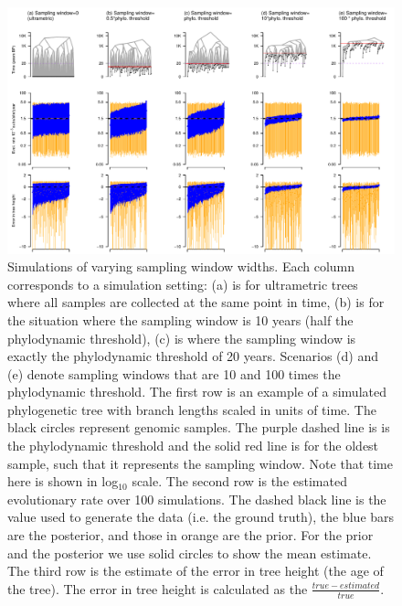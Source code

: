 \documentclass[11pt]{article}
\begin{document}
\begin{landscape}
	\begin{figure}[H]
		\begin{center}
			\includegraphics[scale=0.7, angle=0]{summary_all_estimates_correct_prior.pdf}
			\caption{Simulations of varying sampling window widths. Each column corresponds to a simulation setting: (a) is for ultrametric trees where all samples are collected at the same point in time, (b) is for the situation where the sampling window is 10 years (half the phylodynamic threshold), (c) is where the sampling window is exactly the phylodynamic threshold of 20 years. Scenarios (d) and (e) denote sampling windows that are 10 and 100 times the phylodynamic threshold. The first row is an example of a simulated phylogenetic tree with branch lengths scaled in units of time. The black circles represent genomic samples. The purple dashed line is is the phylodynamic threshold and the solid red line is for the oldest sample, such that it represents the sampling window. Note that time here is shown in log$_{10}$ scale. The second row is the estimated evolutionary rate over 100 simulations. The dashed black line is the value used to generate the data (i.e. the ground truth), the blue bars are the posterior, and those in orange are the prior. For the prior and the posterior we use solid circles to show the mean estimate. The third row is the estimate of the error in tree height (the age of the tree). The error in tree height is calculated as the $\frac{true-estimated}{true}$.}
			\label{figure:Fig2}
		\end{center}
	\end{figure}
\end{landscape}
\end{document}
